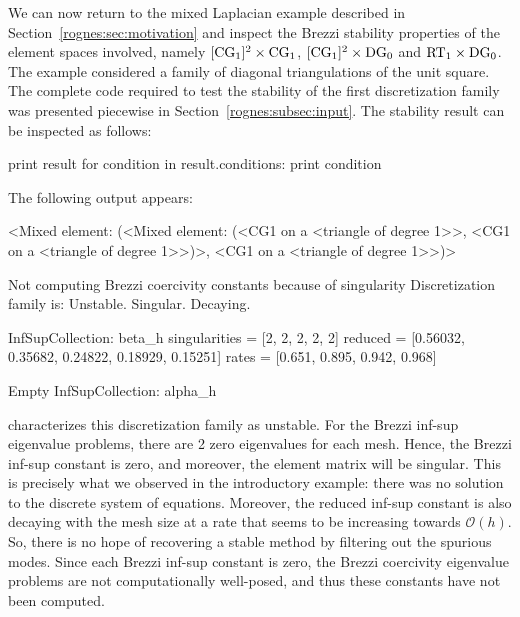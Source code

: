 We can now return to the mixed Laplacian example described in
Section~\ref{rognes:sec:motivation} and inspect the Brezzi stability
properties of the element spaces involved, namely
$[\mathrm{CG}_{1}]^{2} \times \mathrm{CG}_{1}$, $[\mathrm{CG}_{1}]^{2}
\times \mathrm{DG}_{0}$ and $\mathrm{RT}_{1} \times \mathrm{DG}_{0}$. The
example considered a family of diagonal triangulations of the unit
square. The complete code required to test the stability of the first
discretization family was presented piecewise in
Section~\ref{rognes:subsec:input}. The stability result can be
inspected as follows:
\begin{python}
print result
for condition in result.conditions:
    print condition
\end{python}
The following output appears:
\begin{python}
<Mixed element: (<Mixed element: (<CG1 on a <triangle of degree 1>>,
<CG1 on a <triangle of degree 1>>)>, <CG1 on a <triangle of degree 1>>)>

Not computing Brezzi coercivity constants because of singularity
Discretization family is: Unstable. Singular. Decaying.

InfSupCollection: beta_h
singularities =  [2, 2, 2, 2, 2]
reduced =        [0.56032, 0.35682, 0.24822, 0.18929, 0.15251]
rates  =         [0.651, 0.895, 0.942, 0.968]

Empty InfSupCollection: alpha_h
\end{python}
\rognesascot{} characterizes this discretization family as
unstable. For the Brezzi inf-sup eigenvalue problems, there are 2 zero
eigenvalues for each mesh. Hence, the Brezzi inf-sup constant is zero,
and moreover, the element matrix will be singular. This is precisely
what we observed in the introductory example: there was no solution to
the discrete system of equations. Moreover, the reduced inf-sup
constant is also decaying with the mesh size at a rate that seems to
be increasing towards $\mathcal{O}(h)$. So, there is no hope of
recovering a stable method by filtering out the spurious modes. Since
each Brezzi inf-sup constant is zero, the Brezzi coercivity eigenvalue
problems are not computationally well-posed, and thus these constants
have not been computed.

